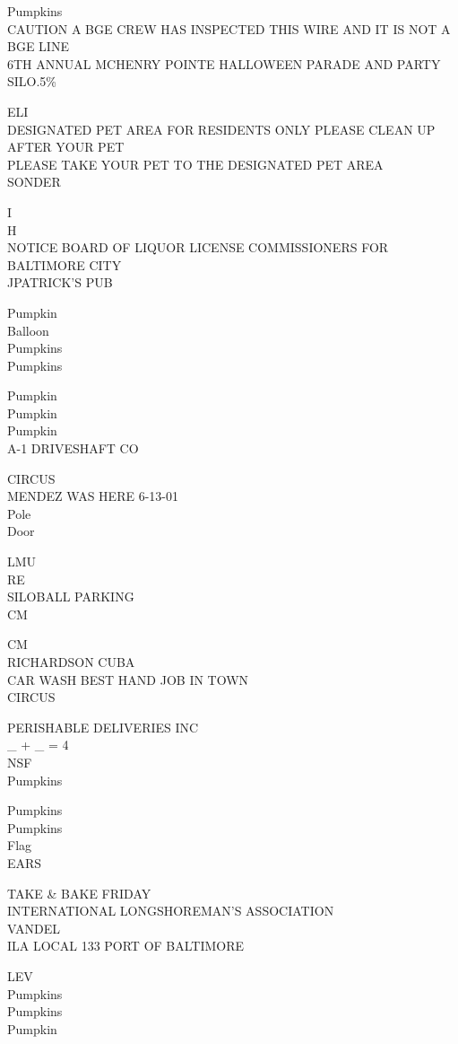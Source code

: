 \documentclass[10pt,letterpaper]{article}
\begin{document}
Pumpkins\\
CAUTION A BGE CREW HAS INSPECTED THIS WIRE AND IT IS NOT A BGE LINE\\
6TH ANNUAL MCHENRY POINTE HALLOWEEN PARADE AND PARTY\\
SILO.5\%

ELI\\
DESIGNATED PET AREA FOR RESIDENTS ONLY PLEASE CLEAN UP AFTER YOUR PET\\
PLEASE TAKE YOUR PET TO THE DESIGNATED PET AREA\\
SONDER

I\\
H\\
NOTICE BOARD OF LIQUOR LICENSE COMMISSIONERS FOR BALTIMORE CITY\\
JPATRICK'S PUB

Pumpkin\\
Balloon\\
Pumpkins\\
Pumpkins

Pumpkin\\
Pumpkin\\
Pumpkin\\
A{-}1 DRIVESHAFT CO

CIRCUS\\
MENDEZ WAS HERE 6{-}13{-}01\\
Pole\\
Door

LMU\\
RE\\
SILOBALL PARKING\\
CM

CM\\
RICHARDSON CUBA\\
CAR WASH BEST HAND JOB IN TOWN\\
CIRCUS

PERISHABLE DELIVERIES INC\\
\_ + \_ = 4\\
NSF\\
Pumpkins

Pumpkins\\
Pumpkins\\
Flag\\
EARS

TAKE \& BAKE FRIDAY\\
INTERNATIONAL LONGSHOREMAN'S ASSOCIATION\\
VANDEL\\
ILA LOCAL 133 PORT OF BALTIMORE

LEV\\
Pumpkins\\
Pumpkins\\
Pumpkin
\end{document}
